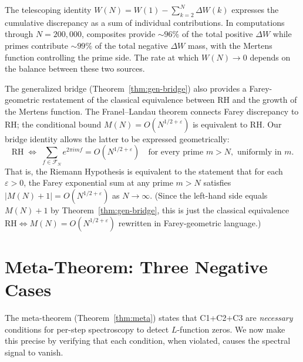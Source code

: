 \documentclass[11pt]{article}
\theoremstyle{definition}
\newcommand{\F}{\mathcal{F}}
\begin{document}
The telescoping identity $W(N) = W(1) - \sum_{k=2}^{N} \Delta W(k)$
expresses the cumulative discrepancy as a sum of individual
contributions.  In computations through $N = 200{,}000$,
composites provide $\sim\!96\%$ of the total positive $\Delta W$
while primes contribute $\sim\!99\%$ of the total negative
$\Delta W$ mass, with the
Mertens function controlling the prime side.  The rate at which
$W(N) \to 0$ depends on the balance between these two sources.

The generalized bridge (Theorem~\ref{thm:gen-bridge}) also
provides a Farey-geometric restatement of the classical
equivalence between RH and the growth of the Mertens function.
The Franel--Landau theorem connects Farey discrepancy to RH\@;
the conditional bound
$M(N) = O(N^{1/2+\varepsilon})$ is equivalent to RH\@.
Our bridge identity allows the latter to be expressed
geometrically:
\[
  \text{RH} \;\Longleftrightarrow\;
  \sum_{f \in \F_N} e^{2\pi i m f} = O(N^{1/2+\varepsilon})
  \quad\text{for every prime } m > N, \text{ uniformly in } m.
\]
That is, the Riemann Hypothesis is equivalent to the statement
that for each $\varepsilon > 0$, the Farey exponential sum at any
prime $m > N$ satisfies $|M(N)+1| = O(N^{1/2+\varepsilon})$
as $N \to \infty$.  (Since the left-hand side equals $M(N)+1$ by
Theorem~\ref{thm:gen-bridge}, this is just the classical
equivalence $\text{RH} \Leftrightarrow M(N) = O(N^{1/2+\varepsilon})$
rewritten in Farey-geometric language.)


\section{Meta-Theorem: Three Negative Cases}\label{sec:negative-cases}

The meta-theorem (Theorem~\ref{thm:meta}) states that C1+C2+C3 are
\emph{necessary} conditions for per-step spectroscopy to detect
$L$-function zeros.  We now make this precise by verifying that
each condition, when violated, causes the spectral signal to vanish.
\end{document}
